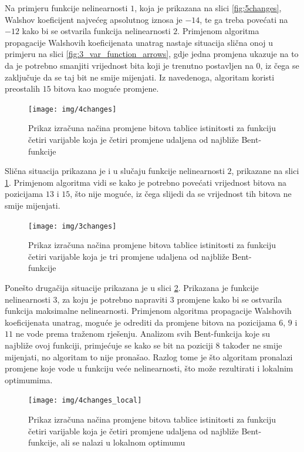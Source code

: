 Na primjeru funkcije nelinearnosti $1$, koja je prikazana na slici \ref{fig:5changes}, Walshov koeficijent najvećeg apsolutnog iznosa je $-14$, te ga treba povećati na $-12$ kako bi se ostvarila funkcija nelinearnosti $2$.
Primjenom algoritma propagacije Walshovih koeficijenata unatrag nastaje situacija slična onoj u primjeru na slici \ref{fig:3_var_function_arrows}, gdje jedna promjena ukazuje na to da je potrebno smanjiti vrijednost bita koji je trenutno postavljen na $0$, iz čega se zaključuje da se taj bit ne smije mijenjati.
Iz navedenoga, algoritam koristi preostalih $15$ bitova kao moguće promjene.

\begin{figure}[ht!] 
    \centering
    \texttt{[image: img/4changes]}
    \captionsetup{justification=centering}
    \caption{Prikaz izračuna načina promjene bitova tablice istinitosti za funkciju četiri varijable koja je četiri promjene udaljena od najbliže Bent-funkcije}
    \label{fig:4changes}
\end{figure}

Slična situacija prikazana je i u slučaju funkcije nelinearnosti $2$, prikazane na slici \ref{fig:4changes}.
Primjenom algoritma vidi se kako je potrebno povećati vrijednost bitova na pozicijama $13$ i $15$, što nije moguće, iz čega slijedi da se vrijednost tih bitova ne smije mijenjati.

\begin{figure}[ht!] 
    \centering
    \texttt{[image: img/3changes]}
    \captionsetup{justification=centering}
    \caption{Prikaz izračuna načina promjene bitova tablice istinitosti za funkciju četiri varijable koja je tri promjene udaljena od najbliže Bent-funkcije}
    \label{fig:3changes}
\end{figure}

Ponešto drugačija situacije prikazana je u slici \ref{fig:3changes}.
Prikazana je funkcije nelinearnosti $3$, za koju je potrebno napraviti $3$ promjene kako bi se ostvarila funkcija maksimalne nelinearnosti.
Primjenom algoritma propagacije Walshovih koeficijenata unatrag, moguće je odrediti da promjene bitova na pozicijama $6$, $9$ i $11$ ne vode prema traženom rješenju.
Analizom svih Bent-funkcija koje su najbliže ovoj funkciji, primjećuje se kako se bit na poziciji $8$ također ne smije mijenjati, no algoritam to nije pronašao.
Razlog tome je što algoritam pronalazi promjene koje vode u funkciju veće nelinearnosti, što može rezultirati i lokalnim optimumima.

\begin{figure}[ht!] 
    \centering
    \texttt{[image: img/4changes\_local]}
    \captionsetup{justification=centering}
    \caption{Prikaz izračuna načina promjene bitova tablice istinitosti za funkciju četiri varijable koja je četiri promjene udaljena od najbliže Bent-funkcije, ali se nalazi u lokalnom optimumu}
    \label{fig:4changes_local}
\end{figure}

